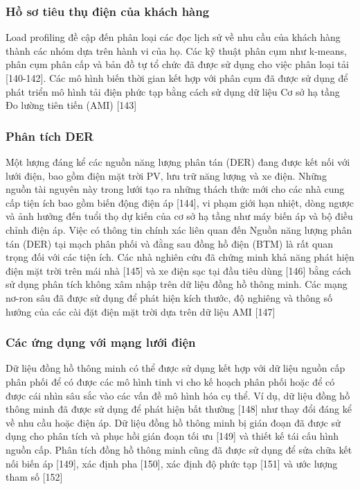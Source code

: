 \documentclass[utf8]{frontiersSCNS} %
\begin{document}
\subsubsection{Hồ sơ tiêu thụ điện của khách hàng}

Load profiling đề cập đến phân loại các đọc lịch sử về nhu cầu của khách hàng thành các nhóm dựa trên hành vi của họ. Các kỹ thuật phân cụm như k-means, phân cụm phân cấp và bản đồ tự tổ chức đã được sử dụng cho việc phân loại tải [140-142]. Các mô hình biến thời gian kết hợp với phân cụm đã được sử dụng để phát triển mô hình tải điện phức tạp bằng cách sử dụng dữ liệu Cơ sở hạ tầng Đo lường tiên tiến (AMI) [143]


\subsubsection{Phân tích DER}
Một lượng đáng kể các nguồn năng lượng phân tán (DER) đang được kết nối với lưới điện, bao gồm điện mặt trời PV, lưu trữ năng lượng và xe điện. Những nguồn tài nguyên này trong lưới tạo ra những thách thức mới cho các nhà cung cấp tiện ích bao gồm biến động điện áp [144], vi phạm giới hạn nhiệt, dòng ngược và ảnh hưởng đến tuổi thọ dự kiến của cơ sở hạ tầng như máy biến áp và bộ điều chỉnh điện áp. Việc có thông tin chính xác liên quan đến Nguồn năng lượng phân tán (DER) tại mạch phân phối và đằng sau đồng hồ điện (BTM) là rất quan trọng đối với các tiện ích. Các nhà nghiên cứu đã chứng minh khả năng phát hiện điện mặt trời trên mái nhà [145] và xe điện sạc tại đầu tiêu dùng [146] bằng cách sử dụng phân tích không xâm nhập trên dữ liệu đồng hồ thông minh. Các mạng nơ-ron sâu đã được sử dụng để phát hiện kích thước, độ nghiêng và thông số hướng của các cài đặt điện mặt trời dựa trên dữ liệu AMI [147]


\subsubsection{Các ứng dụng với mạng lưới điện}
Dữ liệu đồng hồ thông minh có thể được sử dụng kết hợp với dữ liệu nguồn cấp phân phối để có được các mô hình tinh vi cho kế hoạch phân phối hoặc để có được cái nhìn sâu sắc vào các vấn đề mô hình hóa cụ thể. Ví dụ, dữ liệu đồng hồ thông minh đã được sử dụng để phát hiện bất thường [148] như thay đổi đáng kể về nhu cầu hoặc điện áp. Dữ liệu đồng hồ thông minh bị gián đoạn đã được sử dụng cho phân tích và phục hồi gián đoạn tối ưu [149] và thiết kế tái cấu hình nguồn cấp. Phân tích đồng hồ thông minh cũng đã được sử dụng để sửa chữa kết nối biến áp [149], xác định pha [150], xác định độ phức tạp [151] và ước lượng tham số [152]
\end{document}
